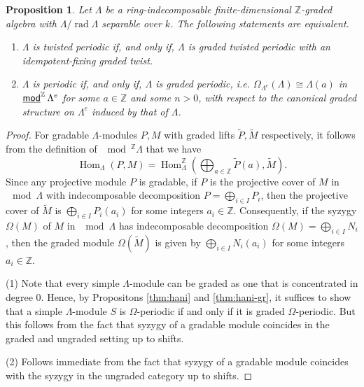 \documentclass[a4paper,reqno,11pt]{amsart}
\newtheorem{proposition}[theorem]{Proposition}
\theoremstyle{definition}
\newcommand{\Z}{\mathbb{Z}}
\newcommand{\Hom}{\operatorname{Hom}\nolimits}
\newcommand{\rad}{\operatorname{rad}\nolimits}
\newcommand{\stmod}{\mathop{\underline{\mod}}\nolimits}
\numberwithin{equation}{section}
\begin{document}
\begin{proposition}\label{gr=ungr}
Let $\Lambda$ be a ring-indecomposable finite-dimensional $\Z$-graded algebra with $\Lambda/\rad\Lambda$ separable over $k$. The following statements are equivalent.
\begin{enumerate}[(1)]
\item $\Lambda$ is twisted periodic if, and only if, $\Lambda$ is graded twisted periodic with an idempotent-fixing graded twist.

\item $\Lambda$ is periodic if, and only if, $\Lambda$ is graded periodic, i.e. $\Omega_{\Lambda^e}(\Lambda)\cong \Lambda(a)$ in $\stmod^\Z \Lambda^e$ for some $a\in \Z$ and some $n>0$, with respect to the canonical graded structure on $\Lambda^e$ induced by that of $\Lambda$.
\end{enumerate}
\end{proposition}
\begin{proof}
For gradable $\Lambda$-modules $P,M$ with graded lifts $\widetilde{P}, \widetilde{M}$ respectively, it follows from the definition of $\mod^\Z\Lambda$ that we have
\[\Hom_{\Lambda}(P,M) = \Hom_{\Lambda}^\Z( \bigoplus_{a\in \Z}\widetilde{P}(a), \widetilde{M}). \] 
Since any projective module $P$ is gradable, if $P$ is the projective cover of $M$ in $\mod\Lambda$ with indecomposable decomposition $P=\bigoplus_{i\in I} P_i$, then the projective cover of $\widetilde{M}$ is $\bigoplus_{i\in I} P_i(a_i)$ for some integers $a_i\in \Z$.  Consequently, if the syzygy $\Omega(M)$ of $M$ in $\mod \Lambda$ has indecomposable decomposition $\Omega(M)=\bigoplus_{i\in I} N_i$, then the graded module $\Omega(\widetilde{M})$ is given by $\bigoplus_{i\in I}N_i(a_i)$ for some integers $a_i\in \Z$.

(1)  Note that every simple $\Lambda$-module can be graded as one that is concentrated in degree 0.  Hence, by Propositons \ref{thm:hani} and \ref{thm:hani-gr}, it suffices to show that a simple $\Lambda$-module $S$ is $\Omega$-periodic if and only if it is graded $\Omega$-periodic.  But this follows from the fact that syzygy of a gradable module coincides in the graded and ungraded setting up to shifts.

(2)  Follows immediate from the fact that syzygy of a gradable module coincides with the syzygy in the ungraded category up to shifts.
\end{proof}
\end{document}
